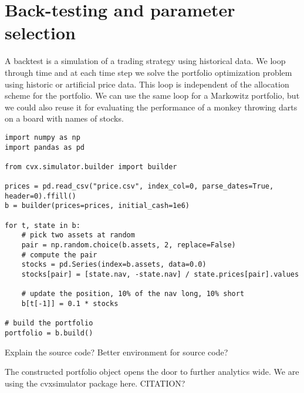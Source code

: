 \documentclass[12pt]{article}
\begin{document}
\section{Back-testing and parameter selection}

A backtest is a simulation of a trading strategy using historical data.
We loop through time and at each time step we solve the portfolio optimization problem
using historic or artificial price data.
This loop is independent of the allocation
scheme for the portfolio.
We can use the same loop for a Markowitz portfolio,
but we could also reuse it for evaluating the performance of a monkey throwing darts
on a board with names of stocks.

\begin{verbatim}
import numpy as np
import pandas as pd

from cvx.simulator.builder import builder

prices = pd.read_csv("price.csv", index_col=0, parse_dates=True, header=0).ffill()
b = builder(prices=prices, initial_cash=1e6)

for t, state in b:
    # pick two assets at random
    pair = np.random.choice(b.assets, 2, replace=False)
    # compute the pair
    stocks = pd.Series(index=b.assets, data=0.0)
    stocks[pair] = [state.nav, -state.nav] / state.prices[pair].values

    # update the position, 10% of the nav long, 10% short
    b[t[-1]] = 0.1 * stocks

# build the portfolio
portfolio = b.build()
\end{verbatim}
Explain the source code? Better environment for source code?

The constructed portfolio object opens the door to further analytics wide.
We are using the cvxsimulator package here. CITATION?





\clearpage


\clearpage
\appendix
\end{document}
